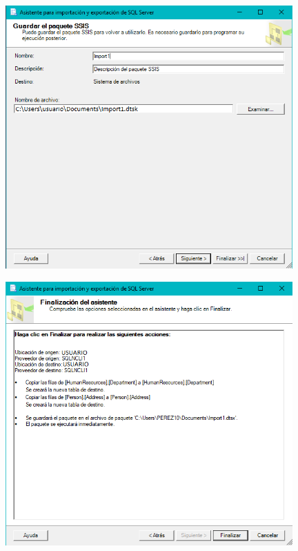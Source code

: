 	\begin{center}
	\includegraphics[width=11cm]{./Imagenes/img9}
	\end{center}	
	\begin{center}
	\includegraphics[width=11cm]{./Imagenes/img10}
	\end{center}	

